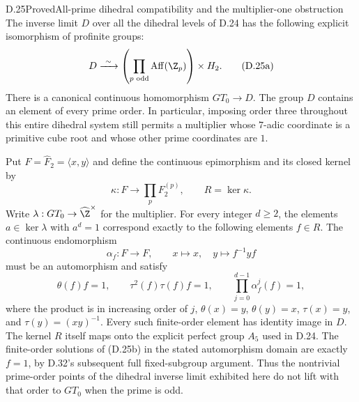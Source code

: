 \begin{claim}{D.25}{Proved}{All-prime dihedral compatibility and the multiplier-one obstruction}
The inverse limit $D$ over all the dihedral levels of D.24 has the
following explicit isomorphism of profinite groups:
\[
 D\xrightarrow{\ \sim\ }
 \left(\prod_{p\text{ odd}}\operatorname{Aff}(\Z_p)\right)
 \times H_2.                                                   \tag{D.25a}
\]
There is a canonical continuous homomorphism $GT_0\to D$.
The group $D$ contains an element of every prime order. In
particular, imposing order three throughout this entire
dihedral system still permits a multiplier whose $7$-adic
coordinate is a primitive cube root and whose other prime
coordinates are $1$.

Put $F=\widehat F_2=\langle x,y\rangle$ and define the continuous
epimorphism and its closed kernel by
\[
 \kappa:F\longrightarrow\prod_pF_2^{(p)},\qquad
 R=\ker\kappa.
\]
Write $\lambda:GT_0\to\widehat\Z^\times$ for the multiplier.
For every integer $d\geq2$, the elements $a\in\ker\lambda$
with $a^d=1$ correspond exactly to the following elements
$f\in R$. The continuous endomorphism
\[
 \alpha_f:F\to F,\qquad x\mapsto x,\quad y\mapsto f^{-1}yf
\]
must be an automorphism and satisfy
\[
 \theta(f)f=1,\qquad
 \tau^2(f)\tau(f)f=1,\qquad
 \prod_{j=0}^{d-1}\alpha_f^{j}(f)=1,                         \tag{D.25b}
\]
where the product is in increasing order of $j$,
$\theta(x)=y$, $\theta(y)=x$, $\tau(x)=y$, and
$\tau(y)=(xy)^{-1}$. Every such finite-order element has identity
image in $D$. The kernel $R$ itself maps onto the explicit
perfect group $A_5$ used in D.24.
The finite-order solutions of (D.25b) in the stated
automorphism domain are exactly $f=1$, by D.32's subsequent
full fixed-subgroup argument.  Thus the nontrivial prime-order
points of the dihedral inverse limit exhibited here do not
lift with that order to $GT_0$ when the prime is odd.
\end{claim}
